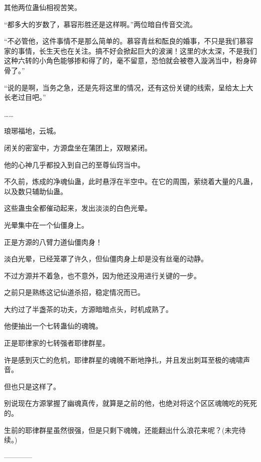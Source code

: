 \begin{this_body}
其他两位蛊仙相视苦笑。

“都多大的岁数了，慕容形胜还是这样啊。”两位暗自传音交流。

“不必管他，这件事情不是那么简单的。慕容青丝和酝良的婚事，不只是我们慕容家的事情，长生天也在关注。搞不好会掀起巨大的波澜！这里的水太深，不是我们这种六转的小角色能够掺和得了的，毫不留意，恐怕就会被卷入漩涡当中，粉身碎骨了。”

“说的是啊，当务之急，还是先将这里的情况，还有这份关键的线索，呈给太上大长老过目吧。”

……

琅琊福地，云城。

闭关的密室中，方源盘坐在蒲团上，双眼紧闭。

他的心神几乎都投入到自己的至尊仙窍当中。

不久前，炼成的净魂仙蛊，此时悬浮在半空中。在它的周围，萦绕着大量的凡蛊，以及数只辅助仙蛊。

这些蛊虫全都催动起来，发出淡淡的白色光晕。

光晕集中在一个仙僵身上。

正是方源的八臂力道仙僵肉身！

淡白光晕，已经笼罩了许久，但仙僵肉身上却是没有丝毫的动静。

不过方源并不着急，也不意外，因为他还没用进行关键的一步。

之前只是熟练这记仙道杀招，稳定情况而已。

大约过了半盏茶的功夫，方源暗暗点头，时机成熟了。

他便抽出一个七转蛊仙的魂魄。

正是耶律家的七转强者耶律群星。

许是感到灭亡的危机，耶律群星的魂魄不断地挣扎，并且发出刺耳至极的魂啸声音。

但也只是这样了。

别说现在方源掌握了幽魂真传，就算是之前的他，也绝对将这个区区魂魄吃的死死的。

生前的耶律群星虽然很强，但是只剩下魂魄，还能翻出什么浪花来呢？(未完待续。)

------------

\end{this_body}

